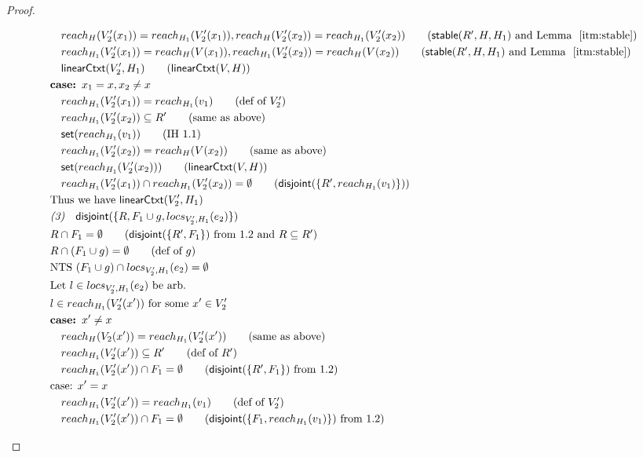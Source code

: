 \documentclass{easychair}
\newcommand{\ms}[1]{\ensuremath{\mathsf{#1}}}
\newcommand{\na}[1]{\mathsf{linearCtxt}(#1)}
\newcommand{\stable}[1]{\mathsf{stable}(#1)}
\newcommand{\dist}[1]{\mathsf{disjoint}(#1)}
\theoremstyle{definition}
\begin{document}
\begin{proof}
\begin{description}
\begin{align*}
  &\quad reach_H(V_2'(x_1)) = reach_{H_1}(V_2'(x_1)),reach_H(V_2'(x_2)) = reach_{H_1}(V_2'(x_2)) \tag{$\stable{R',H,H_1}$ and Lemma $~\ref{itm:stable}$}\\
  &\quad reach_{H_1}(V_2'(x_1)) = reach_{H}(V(x_1)),reach_{H_1}(V_2'(x_2)) = reach_{H}(V(x_2)) \tag{$\stable{R',H,H_1}$ and Lemma $~\ref{itm:stable}$}\\
  &\quad \na{V_2',H_1} \tag{$\na{V,H}$}\\
  &\textbf{case: } x_1 = x, x_2 \ne x\\
  &\quad reach_{H_1}(V_2'(x_1)) = reach_{H_1}(v_1) \tag{def of $V_2'$}\\
  &\quad reach_{H_1}(V_2'(x_2)) \subseteq R' \tag{same as above}\\
  &\quad \ms{set}(reach_{H_1}(v_1)) \tag{IH 1.1}\\
  &\quad reach_{H_1}(V_2'(x_2)) = reach_{H}(V(x_2)) \tag{same as above}\\
  &\quad \ms{set}(reach_{H_1}(V_2'(x_2))) \tag{$\na{V,H}$}\\
  &\quad reach_{H_1}(V_2'(x_1)) \cap reach_{H_1}(V_2'(x_2)) = \emptyset \tag{$\dist{\{R',reach_{H_1}(v_1)\}}$}\\
  &\text{Thus we have } \na{V_2',H_1}\\
  &\emph{(3)}\quad \dist{\{R,F_1 \cup g,locs_{V_2',H_1}(e_2)\}}\\
  &R \cap F_1 = \emptyset \tag{$\dist{\{R', F_1\}}$ from 1.2 and $R \subseteq R'$}\\
  &R \cap (F_1 \cup g) = \emptyset \tag{def of $g$}\\
  &\text{NTS } (F_1 \cup g) \cap locs_{V_2',H_1}(e_2) = \emptyset\\
  &\text{Let } l \in locs_{V_2',H_1}(e_2) \text{ be arb.}\\
  &l \in reach_{H_1}(V_2'(x')) \text{ for some } x' \in V_2'\\
  &\textbf{case: } x' \ne x\\
  &\quad reach_H(V_2(x')) = reach_{H_1}(V_2'(x')) \tag{same as above}\\
  &\quad reach_{H_1}(V_2'(x')) \subseteq R' \tag{def of $R'$}\\
  &\quad reach_{H_1}(V_2'(x')) \cap F_1 = \emptyset \tag{$\dist{\{R', F_1\}}$ from 1.2}\\
  &\text{case: } x' = x\\
  &\quad reach_{H_1}(V_2'(x')) = reach_{H_1}(v_1) \tag{def of $V_2'$}\\
  &\quad reach_{H_1}(V_2'(x')) \cap F_1 = \emptyset \tag{$\dist{\{F_1,reach_{H_1}(v_1)\}}$ from 1.2}\\

\end{align*}
\end{description}
\end{proof}
\end{document}
